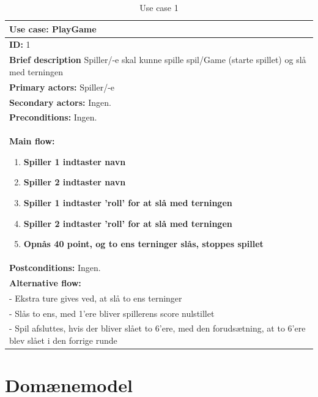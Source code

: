 \begin{table}[H]
    \begin{center}
        \begin{tabular}{ | p{15cm} |}
            \hline
            \textbf{Use case:} PlayGame \\ \hline
            \textbf{ID:} 1 \\ \hline
            \textbf{Brief description} Spiller/-e skal kunne spille spil/Game (starte spillet) og slå med terningen     \\ \hline
            \textbf{Primary actors:} Spiller/-e \\ \hline
            \textbf{Secondary actors:} Ingen. \\ \hline
            \textbf{Preconditions:} Ingen.     \\ \hline
            \textbf{Main flow:}
            \begin{enumerate}
                \item \textbf{Spiller 1 indtaster navn}
                \item \textbf{Spiller 2 indtaster navn}
                \item \textbf{Spiller 1 indtaster 'roll' for at slå med terningen}
                \item \textbf{Spiller 2 indtaster 'roll' for at slå med terningen}
                \item \textbf{Opnås 40 point, og to ens terninger slås, stoppes spillet}    
            \end{enumerate} \\ \hline
            \textbf{Postconditions:} Ingen.\\ \hline
            \textbf{Alternative flow:}
            \\- Ekstra ture gives ved, at slå to ens terninger
            \\- Slås to ens, med 1’ere bliver spillerens score nulstillet
            \\- Spil afsluttes, hvis der bliver slået to 6’ere, med den forudsætning, at to 6’ere blev slået i den forrige runde  \\ \hline
            \hline
        \end{tabular}
        \caption{Use case 1}
        \label{usecase:1}
    \end{center}
\end{table}

\newpage

\section{Domænemodel}


